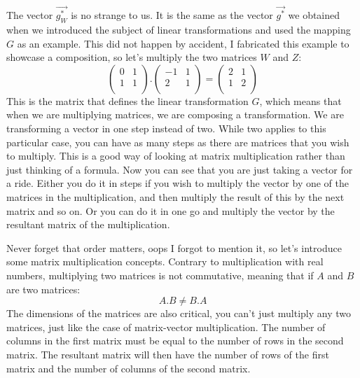 \documentclass[600paper, 11pt,twoside,openany]{kdp}
\begin{document}
\newpage
The vector $\overrightarrow{g_W^*}$ is no strange to us. It is the same as the vector $\overrightarrow{g^*}$ we obtained when we introduced the subject of linear transformations and used the mapping $G$ as an example. This  did not happen by accident, I fabricated this example to showcase a composition, so let's multiply the two matrices $W$ and $Z$:
\[\begin{pmatrix}
0 & 1\\
1 & 1 \\
\end{pmatrix}.
\begin{pmatrix}
-1 & 1 \\
2 & 1 \\
\end{pmatrix} = \begin{pmatrix}
2 & 1 \\
1 & 2 \\
\end{pmatrix}
\]
\indent This is the matrix that defines the linear transformation $G$, which means that when we are multiplying matrices, we are composing a transformation. We are transforming a vector in one step instead of two. While two applies to this particular case, you can have as many steps as there are matrices that you wish to multiply. This is a good way of looking at matrix multiplication rather than just thinking of a formula. Now you can see that you are just taking a vector for a ride. Either you do it in steps if you wish to multiply the vector by one of the matrices in the multiplication, and then multiply the result of this by the next matrix and so on. Or you can do it in one go and multiply the vector by the resultant matrix of the multiplication.
\par 
\vspace{-3pt}
\indent Never forget that order matters, oops I forgot to mention it, so let’s introduce some matrix multiplication concepts. Contrary to multiplication with real numbers, multiplying two matrices is not commutative, meaning that if $A$ and $B$ are two matrices:
\[A.B \neq B.A\]
\indent The dimensions of the matrices are also critical, you can’t just multiply any two matrices, just like the case of matrix-vector multiplication. The number of columns in the first matrix must be equal to the number of rows in the second matrix. The resultant matrix will then have  the number of rows of the first matrix and the number of columns of the second matrix.
\newpage
\end{document}
